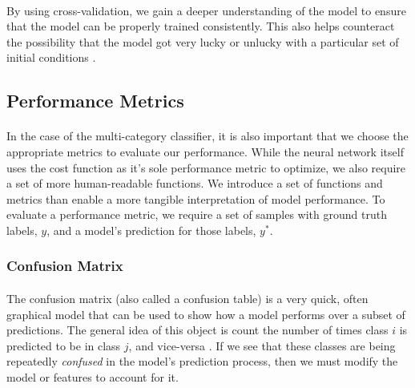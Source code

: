 \documentclass[12pt,letterpaper]{article}
\begin{document}
\paragraph*{}By using cross-validation, we gain a deeper understanding of the model to ensure that the model can be properly trained consistently. This also helps counteract the possibility that the model got very lucky or unlucky with a particular set of initial conditions \cite{Geron,James}.


\subsection{Performance Metrics}

\paragraph*{}In the case of the multi-category classifier, it is also important that we choose the appropriate metrics to evaluate our performance. While the neural network itself uses the cost function as it's sole performance metric to optimize, we also require a set of more human-readable functions. We introduce a set of functions and metrics than enable a more tangible interpretation of model performance. 
To evaluate a performance metric, we require a set of samples with ground truth labels, $y$, and a model's prediction for those labels, $y^*$.


\subsubsection{Confusion Matrix}

\paragraph*{}The confusion matrix (also called a confusion table) is a very quick, often graphical model that can be used to show how a model performs over a subset of predictions. The general idea of this object is count the number of times class $i$ is predicted to be in class $j$, and vice-versa \cite{Geron}. If we see that these classes are being repeatedly \textit{confused} in the model's prediction process, then we must modify the model or features to account for it. 
\end{document}
